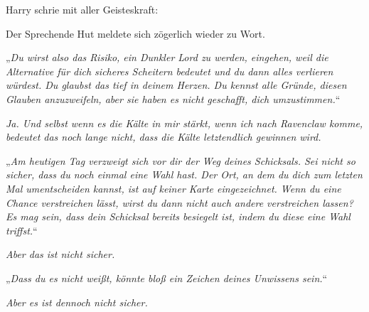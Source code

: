 Harry schrie mit aller Geisteskraft: 

Der Sprechende Hut meldete sich zögerlich wieder zu Wort.

„\emph{Du wirst also das Risiko, ein Dunkler Lord zu werden, eingehen, weil die Alternative für dich sicheres Scheitern bedeutet und du dann alles verlieren würdest. Du glaubst das tief in deinem Herzen. Du kennst alle Gründe, diesen Glauben anzuzweifeln, aber sie haben es nicht geschafft, dich umzustimmen.}“

\emph{Ja. Und selbst wenn es die Kälte in mir \emph{stärkt}, wenn ich nach Ravenclaw komme, bedeutet das noch lange nicht, dass die Kälte letztendlich \emph{gewinnen} wird.}

„\emph{Am heutigen Tag verzweigt sich vor dir der Weg deines Schicksals. Sei nicht so sicher, dass du noch einmal eine Wahl hast. Der Ort, an dem du dich zum \emph{letzten} Mal umentscheiden kannst, ist auf keiner Karte eingezeichnet. Wenn du eine Chance verstreichen lässt, wirst du dann nicht auch andere verstreichen lassen? Es mag sein, dass dein Schicksal bereits besiegelt ist, indem du diese eine Wahl triffst.}“

\emph{Aber das ist nicht sicher. }

„\emph{Dass \emph{du} es nicht \emph{weißt}, könnte bloß ein Zeichen \emph{deines} Unwissens sein.}“

\emph{Aber es ist dennoch nicht sicher.}

